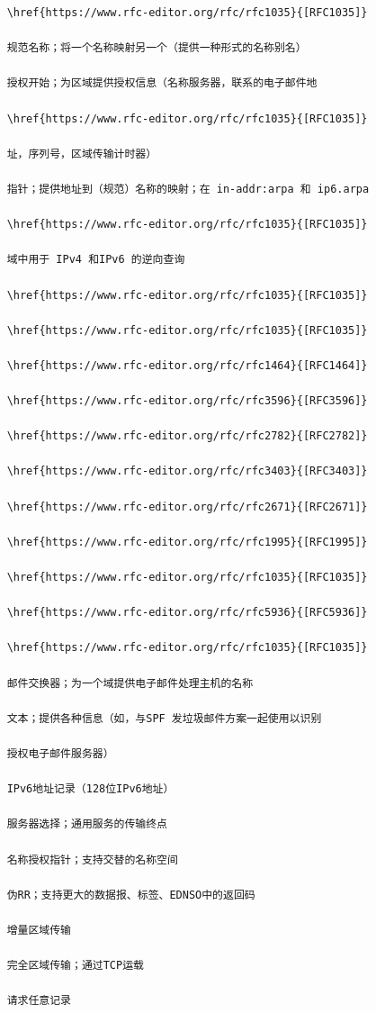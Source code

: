 \begin{verbatim}
    \href{https://www.rfc-editor.org/rfc/rfc1035}{[RFC1035]}
    
    规范名称；将一个名称映射另一个（提供一种形式的名称别名）
    
    授权开始；为区域提供授权信息（名称服务器，联系的电子邮件地
    
    \href{https://www.rfc-editor.org/rfc/rfc1035}{[RFC1035]}
    
    址，序列号，区域传输计时器）
    
    指针；提供地址到（规范）名称的映射；在 in-addr:arpa 和 ip6.arpa
    
    \href{https://www.rfc-editor.org/rfc/rfc1035}{[RFC1035]}
    
    域中用于 IPv4 和IPv6 的逆向查询
    
    \href{https://www.rfc-editor.org/rfc/rfc1035}{[RFC1035]}
    
    \href{https://www.rfc-editor.org/rfc/rfc1035}{[RFC1035]}
    
    \href{https://www.rfc-editor.org/rfc/rfc1464}{[RFC1464]}
    
    \href{https://www.rfc-editor.org/rfc/rfc3596}{[RFC3596]}
    
    \href{https://www.rfc-editor.org/rfc/rfc2782}{[RFC2782]}
    
    \href{https://www.rfc-editor.org/rfc/rfc3403}{[RFC3403]}
    
    \href{https://www.rfc-editor.org/rfc/rfc2671}{[RFC2671]}
    
    \href{https://www.rfc-editor.org/rfc/rfc1995}{[RFC1995]}
    
    \href{https://www.rfc-editor.org/rfc/rfc1035}{[RFC1035]}
    
    \href{https://www.rfc-editor.org/rfc/rfc5936}{[RFC5936]}
    
    \href{https://www.rfc-editor.org/rfc/rfc1035}{[RFC1035]}
    
    邮件交换器；为一个域提供电子邮件处理主机的名称
    
    文本；提供各种信息（如，与SPF 发垃圾邮件方案一起使用以识别
    
    授权电子邮件服务器）
    
    IPv6地址记录（128位IPv6地址）
    
    服务器选择；通用服务的传输终点
    
    名称授权指针；支持交替的名称空间
    
    伪RR；支持更大的数据报、标签、EDNSO中的返回码
    
    增量区域传输
    
    完全区域传输；通过TCP运载
    
    请求任意记录
\end{verbatim}

